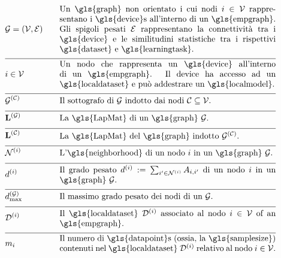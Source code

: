 \begin{align}
 	&\graph = \pair{\nodes}{\edges} & \quad & \parbox{.75\textwidth}{Un \gls{graph} non orientato i cui nodi $\nodeidx \in \nodes$ rappresentano i 
	\gls{device}s all'interno di un \gls{empgraph}. Gli spigoli pesati $\edges$ rappresentano la connettività tra i 
	\gls{device} e le similitudini statistiche tra i rispettivi \gls{dataset} e \gls{learningtask}.}\nonumber \\[2mm] \hline \nonumber\\[-5mm]
&\nodeidx \in \nodes& \quad & \parbox{.75\textwidth}{Un nodo che rappresenta un 
	\gls{device} all'interno di un \gls{empgraph}. Il device ha accesso ad un \gls{localdataset} e può addestrare un \gls{localmodel}.}\nonumber \\[2mm] \hline \nonumber\\[-5mm]
	&\indsubgraph{\graph}{\cluster}& \quad & \parbox{.75\textwidth}{Il sottografo di $\graph$ indotto dai nodi $\cluster \subseteq \nodes$.} \nonumber \\[2mm] \hline \nonumber\\[-5mm]
	&\LapMat{\graph}   & \quad & \parbox{.75\textwidth}{La \gls{LapMat} di un \gls{graph} $\graph$.}\nonumber \\[2mm] \hline \nonumber\\[-5mm]
		&\LapMat{\cluster}   & \quad & \parbox{.75\textwidth}{La \gls{LapMat} del \gls{graph} indotto $\indsubgraph{\graph}{\cluster}$.} \nonumber \\[2mm] \hline \nonumber\\[-5mm]
	 &		\neighbourhood{\nodeidx}  & \quad & \parbox{.75\textwidth}{L'\gls{neighborhood} di un nodo $\nodeidx$ in un \gls{graph} $\graph$.}   \nonumber \\[2mm] \hline \nonumber\\[-5mm]
	&\nodedegree{\nodeidx} & \quad & \parbox{.75\textwidth}{Il grado pesato $\nodedegree{\nodeidx}\defeq \sum_{\nodeidx' \in \neighbourhood{\nodeidx}} \edgeweight_{\nodeidx,\nodeidx'}$ di un nodo $\nodeidx$ in un \gls{graph} $\graph$.}  \nonumber \\[2mm] \hline \nonumber\\[-5mm]
	&\maxnodedegree^{(\graph)} & \quad & \parbox{.75\textwidth}{Il massimo grado pesato dei nodi di un $\graph$.} \nonumber \\[2mm] \hline \nonumber\\[-5mm] 
&\localdataset{\nodeidx} & \quad & \parbox{.75\textwidth}{Il \gls{localdataset} $\localdataset{\nodeidx}$ associato al nodo $\nodeidx\in \nodes$ of an \gls{empgraph}.} \nonumber \\[2mm] \hline \nonumber\\[-5mm]
&\localsamplesize{\nodeidx} & \quad & \parbox{.75\textwidth}{Il numero di \gls{datapoint}s (ossia, la \gls{samplesize}) contenuti nel 
			\gls{localdataset} $\localdataset{\nodeidx}$ relativo al nodo $\nodeidx\in \nodes$.} \nonumber 
\end{align} 
